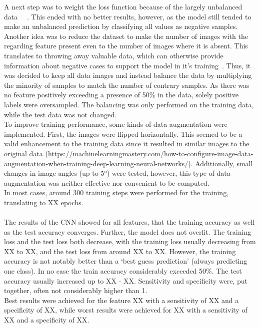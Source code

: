 A next step was to weight the loss function because of the largely unbalanced data~\citep{he2009learning} ~\citep{batista2004study}. This ended with no better results, however, as the model still tended to make an unbalanced prediction by classifying all values as negative samples. Another idea was to reduce the dataset to make the number of images with the regarding feature present even to the number of images where it is absent. This translates to throwing away valuable data, which can otherwise provide information about negative cases to support the model in it’s training~\citep{batista2004study}. Thus, it was decided to keep all data images and instead balance the data by multiplying the minority of samples to match the number of contrary samples. As there was no feature positively exceeding a presence of 50\% in the data, solely positive labels were oversampled. The balancing was only performed on the training data, while the test data was not changed. \\
To improve training performance, some kinds of data augmentation were implemented. First, the images were flipped horizontally. This seemed to be a valid enhancement to the training data since it resulted in similar images to the original data (\url{https://machinelearningmastery.com/how-to-configure-image-data-augmentation-when-training-deep-learning-neural-networks/}). Additionally, small changes in image angles (up to 5°) were tested, however, this type of data augmentation was neither effective nor convenient to be computed. \\
In most cases, around 300 training steps were performed for the training, translating to XX epochs. \\
\\
The results of the CNN showed for all features, that the training accuracy as well as the test accuracy converges. Further, the model does not overfit. The training loss and the test loss both decrease, with the training loss usually decreasing from XX to XX, and the test loss from around XX to XX. However, the training accuracy is not notably better than a ‘best guess prediction’ (always predicting one class). In no case the train accuracy considerably exceeded 50\%. The test accuracy usually increased up to XX - XX. Sensitivity and specificity were, put together, often not considerably higher than 1. \\
Best results were achieved for the feature XX with a sensitivity of XX and a specificity of XX, while worst results were achieved for XX with a sensitivity of XX and a specificity of XX. \\
